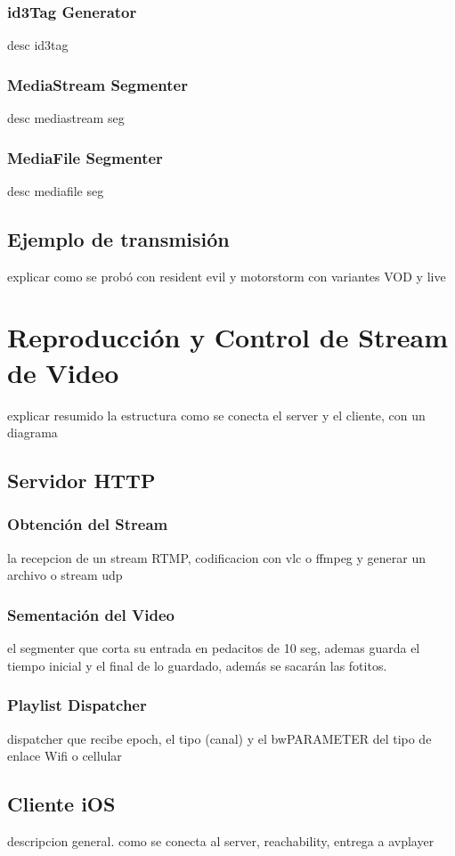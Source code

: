 		\subsubsection{id3Tag Generator}
		desc id3tag
		\subsubsection{MediaStream Segmenter}
		desc mediastream seg
		\subsubsection{MediaFile Segmenter}
		desc mediafile seg
	\subsection{Ejemplo de transmisión}
	
	explicar como se probó con resident evil y motorstorm
	con variantes VOD y live
	
\clearpage	
\section{Reproducción y Control de Stream de Video}
	explicar resumido la estructura como se conecta el server y el cliente, con un  diagrama
	\subsection{Servidor HTTP}
		\subsubsection{Obtención del Stream}
		la recepcion de un stream RTMP, codificacion con vlc o ffmpeg y generar un archivo o stream udp
		\subsubsection{Sementación del Video}
		el segmenter que corta su entrada en pedacitos de 10 seg, ademas guarda el tiempo inicial y el final de lo guardado, además se sacarán las fotitos.
		\subsubsection{Playlist Dispatcher}
		dispatcher que recibe epoch, el tipo (canal) y el bwPARAMETER del tipo de enlace Wifi o cellular		
		
	\subsection{Cliente iOS}
		descripcion general.
		como se conecta al server, reachability, entrega a avplayer
